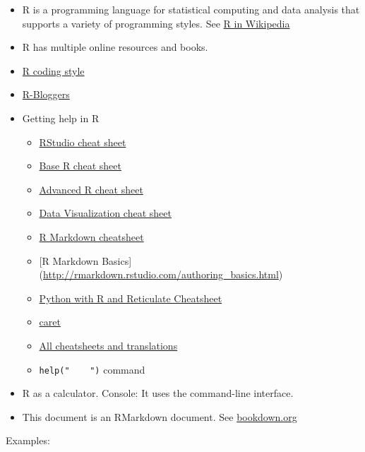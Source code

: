 \documentclass[
]{book}
\providecommand{\tightlist}{%
  \setlength{\itemsep}{0pt}\setlength{\parskip}{0pt}}
\begin{document}
\begin{itemize}
\item
  R is a programming language for statistical computing and data analysis that supports a variety of programming styles. See \href{https://en.wikipedia.org/wiki/R_(programming_language)}{R in Wikipedia}
\item
  R has multiple online resources and books.
\item
  \href{https://google.github.io/styleguide/Rguide.xml}{R coding style}
\item
  \href{https://www.r-bloggers.com/}{R-Bloggers}
\item
  Getting help in R

  \begin{itemize}
  \tightlist
  \item
    \href{https://github.com/rstudio/cheatsheets/raw/master/rstudio-ide.pdf}{RStudio cheat sheet}
  \item
    \href{http://github.com/rstudio/cheatsheets/raw/master/base-r.pdf}{Base R cheat sheet}
  \item
    \href{https://www.rstudio.com/wp-content/uploads/2016/02/advancedR.pdf}{Advanced R cheat sheet}
  \item
    \href{https://github.com/rstudio/cheatsheets/raw/master/data-visualization-2.1.pdf}{Data Visualization cheat sheet}
  \item
    \href{https://github.com/rstudio/cheatsheets/raw/master/rmarkdown-2.0.pdf}{R Markdown cheatsheet}
  \item
    {[}R Markdown Basics{]} (\url{http://rmarkdown.rstudio.com/authoring_basics.html})
  \item
    \href{https://github.com/rstudio/cheatsheets/raw/master/reticulate.pdf}{Python with R and Reticulate Cheatsheet}
  \item
    \href{https://github.com/rstudio/cheatsheets/raw/master/caret.pdf}{caret}
  \item
    \href{https://rstudio.com/resources/cheatsheets/}{All cheatsheets and translations}
  \item
    \texttt{help("\ \ \ \ ")} command
  \end{itemize}
\item
  R as a calculator. Console: It uses the command-line interface.
\item
  This document is an RMarkdown document. See \url{bookdown.org}
\end{itemize}

Examples:
\end{document}
